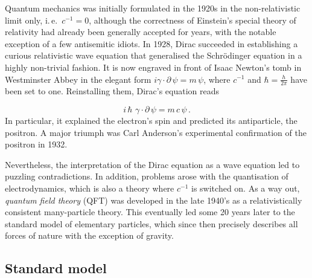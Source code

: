 
\newpage {}
\label{sec:0110}

Quantum mechanics was initially formulated in the 1920s in the non-relativistic limit only, i.\,e.\ $c^{−1}=0$, although the correctness of Einstein's special theory of relativity had already been generally accepted for years, with the notable exception of a few antisemitic idiots. In 1928, Dirac succeeded in establishing a curious relativistic wave equation that generalised the Schrödinger equation in a highly non-trivial fashion. It is now engraved in front of Isaac Newton's tomb in Westminster Abbey in the elegant form $i \gamma \cdot \partial\, \psi = m\, \psi$, where $c^{−1}$ and $\hbar=\frac{h}{2 \pi}$ have been set to one. Reinstalling them, Dirac's equation reads

\begin{equation*}
  i\, \hbar\,\, \gamma \cdot \partial\, \psi = m\,c\, \psi\,.
\end{equation*}
%
In particular, it explained the electron's spin and predicted its antiparticle, the positron. A major triumph was Carl Anderson's experimental confirmation of the positron in 1932.

Nevertheless, the interpretation of the Dirac equation as a wave equation led to puzzling contradictions. In addition, problems arose with the quantisation of electrodynamics, which is also a theory where $c^{−1}$ is switched on. As a way out, \textit{quantum field theory} (QFT) was developed in the late 1940's as a relativistically consistent many-particle theory. This eventually led some 20 years later to the standard model of elementary particles, which since then precisely describes all forces of nature with the exception of gravity.


\subsection*{Standard model}

